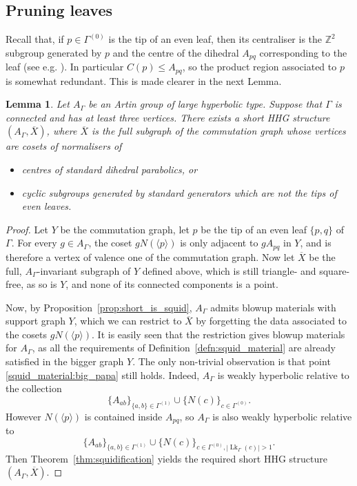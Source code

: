 \documentclass[svgnames]{amsart}
\theoremstyle{plain}
\newtheorem{lemma}[thm]{Lemma}
\theoremstyle{definition}
\newcommand{\Z}{\mathbb{Z}}
\newcommand{\ov}[1]{\overline{#1}}
\newcommand{\link}{\operatorname{Lk}}
\begin{document}
\subsection{Pruning leaves}
Recall that, if $p\in\Gamma^{(0)}$ is the tip of an even leaf, then its centraliser is the $\Z^2$ subgroup generated by $p$ and the centre of the dihedral $A_{pq}$ corresponding to the leaf (see e.g. \cite[Corollary 34]{CMV:parabolics}). In particular $C(p)\le A_{pq}$, so the product region associated to $p$ is somewhat redundant. This is made clearer in the next Lemma.
\begin{lemma}
    Let $A_\Gamma$ be an Artin group of large hyperbolic type. Suppose that $\Gamma$ is connected and has at least three vertices. There exists a short HHG structure $(A_\Gamma, \ov{X})$, where $\ov X$ is the full subgraph of the commutation graph whose vertices are cosets of normalisers of
    \begin{itemize}
        \item centres of standard dihedral parabolics, or
        \item cyclic subgroups generated by standard generators \emph{which are not the tips of even leaves}.
    \end{itemize}
\end{lemma}
\begin{proof}
Let $Y$ be the commutation graph, let $p$ be the tip of an even leaf $\{p,q\}$ of $\Gamma$. For every $g\in A_\Gamma$, the coset $g N(\langle p\rangle)$ is only adjacent to $gA_{pq}$ in $Y$, and is therefore a vertex of valence one of the commutation graph. Now let $\ov X$ be the full, $A_\Gamma$-invariant subgraph of $Y$ defined above, which is still triangle- and square-free, as so is $Y$, and none of its connected components is a point. 

Now, by Proposition~\ref{prop:short_is_squid}, $A_\Gamma$ admits blowup materials with support graph $Y$, which we can restrict to $\ov X$ by forgetting the data associated to the cosets $gN(\langle p\rangle)$. It is easily seen that the restriction gives blowup materials for $A_\Gamma$, as all the requirements of Definition~\ref{defn:squid_material} are already satisfied in the bigger graph $Y$. The only non-trivial observation is that point \eqref{squid_material:big_papa} still holds. Indeed, $A_\Gamma$ is weakly hyperbolic relative to the collection
$$\{A_{ab}\}_{\{a,b\}\in \Gamma^{(1)}}\cup\{N(c)\}_{c\in\Gamma^{(0)}}.$$
However $N(\langle p\rangle)$ is contained inside $A_{pq}$, so $A_\Gamma$ is also weakly hyperbolic relative to 
$$\{A_{ab}\}_{\{a,b\}\in \Gamma^{(1)}}\cup\{N(c)\}_{c\in\Gamma^{(0)}, |\link_\Gamma(c)|>1}.$$
Then Theorem~\ref{thm:squidification} yields the required short HHG structure $(A_\Gamma, \ov X)$.
\end{proof}
\end{document}
